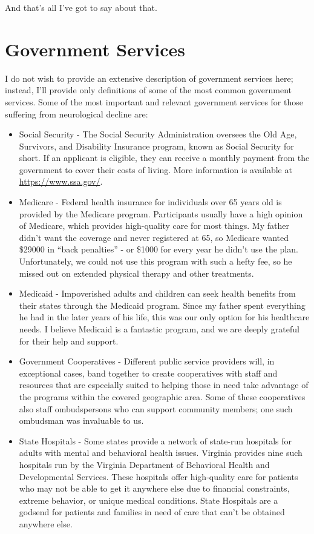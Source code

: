 \documentclass{article}
\begin{document}
And that's all I've got to say about that.

\section*{Government Services}

I do not wish to provide an extensive description of government services here; instead, I'll provide only definitions of some of the most common government services. Some of the most important and relevant government services for those suffering from neurological decline are:

\begin{itemize}
    \item Social Security - The Social Security Administration oversees the Old Age, Survivors, and Disability Insurance program, known as Social Security for short. If an applicant is eligible, they can receive a monthly payment from the government to cover their costs of living. More information is available at \url{https://www.ssa.gov/}.
    \item Medicare - Federal health insurance for individuals over 65 years old is provided by the Medicare program. Participants usually have a high opinion of Medicare, which provides high-quality care for most things. My father didn't want the coverage and never registered at 65, so Medicare wanted \$29000 in ``back penalties'' - or \$1000 for every year he didn't use the plan. Unfortunately, we could not use this program with such a hefty fee, so he missed out on extended physical therapy and other treatments.
    \item Medicaid - Impoverished adults and children can seek health benefits from their states through the Medicaid program. Since my father spent everything he had in the later years of his life, this was our only option for his healthcare needs. I believe Medicaid is a fantastic program, and we are deeply grateful for their help and support.
    \item Government Cooperatives - Different public service providers will, in exceptional cases, band together to create cooperatives with staff and resources that are especially suited to helping those in need take advantage of the programs within the covered geographic area. Some of these cooperatives also staff ombudspersons who can support community members; one such ombudsman was invaluable to us.
    \item State Hospitals - Some states provide a network of state-run hospitals for adults with mental and behavioral health issues. Virginia provides nine such hospitals run by the Virginia Department of Behavioral Health and Developmental Services. These hospitals offer high-quality care for patients who may not be able to get it anywhere else due to financial constraints, extreme behavior, or unique medical conditions. State Hospitals are a godsend for patients and families in need of care that can't be obtained anywhere else.

\end{itemize}
\end{document}
